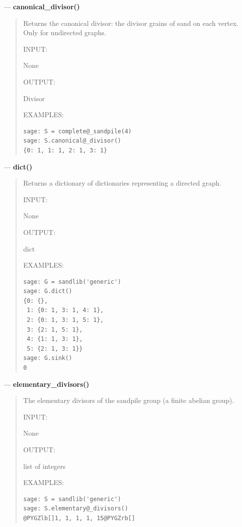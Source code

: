 \documentclass[letterpaper,10pt,english]{manual}
\begin{document}
---
\hypertarget{canonical-divisor}{}
\textbf{canonical\_divisor()}
\begin{quote}

Returns the canonical divisor: the divisor  grains of sand
on each vertex.  Only for undirected graphs.

INPUT:

None

OUTPUT:

Divisor

EXAMPLES:

\begin{Verbatim}[commandchars=@\[\]]
sage: S = complete@_sandpile(4)
sage: S.canonical@_divisor()
{0: 1, 1: 1, 2: 1, 3: 1}
\end{Verbatim}
\end{quote}

---
\hypertarget{dict}{}
\textbf{dict()}
\begin{quote}

Returns a dictionary of dictionaries representing a directed graph.

INPUT:

None

OUTPUT:

dict

EXAMPLES:

\begin{Verbatim}[commandchars=@\[\]]
sage: G = sandlib('generic')
sage: G.dict()
{0: {},
 1: {0: 1, 3: 1, 4: 1},
 2: {0: 1, 3: 1, 5: 1},
 3: {2: 1, 5: 1},
 4: {1: 1, 3: 1},
 5: {2: 1, 3: 1}}
sage: G.sink()
0
\end{Verbatim}
\end{quote}

---
\hypertarget{elementary-divisors}{}
\textbf{elementary\_divisors()}
\begin{quote}

The elementary divisors of the sandpile group (a finite
abelian group).

INPUT:

None

OUTPUT:

list of integers

EXAMPLES:

\begin{Verbatim}[commandchars=@\[\]]
sage: S = sandlib('generic')
sage: S.elementary@_divisors()
@PYGZlb[]1, 1, 1, 1, 15@PYGZrb[]
\end{Verbatim}
\end{quote}
\end{document}
